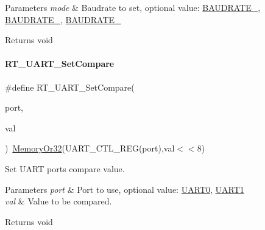 \begin{DoxyParams}{Parameters}
{\em mode} & Baudrate to set, optional value\+: \mbox{\hyperlink{a00056_a89d72bee69b33d0404d33f47608d16f0}{B\+A\+U\+D\+R\+A\+T\+E\+\_}}, \mbox{\hyperlink{a00056_ab94a89ecf1976f304764aec119e215e7}{B\+A\+U\+D\+R\+A\+T\+E\+\_}}, \mbox{\hyperlink{a00056_a9c74d2185a532185624b8dc3086f8e3e}{B\+A\+U\+D\+R\+A\+T\+E\+\_}} \\
\hline
\end{DoxyParams}
\begin{DoxyReturn}{Returns}
void 
\end{DoxyReturn}
\mbox{\label{a00056_a432520c6f67a10918aa07884250a7cbc}} 
\paragraph{\texorpdfstring{R\+T\+\_\+\+U\+A\+R\+T\+\_\+\+Set\+Compare}{RT\_UART\_SetCompare}}
{\footnotesize\ttfamily \#define R\+T\+\_\+\+U\+A\+R\+T\+\_\+\+Set\+Compare(\begin{DoxyParamCaption}\item[{}]{port,  }\item[{}]{val }\end{DoxyParamCaption})~\mbox{\hyperlink{a00020_a27874a97deab7cecdde5ddecf466e31e}{Memory\+Or32}}(U\+A\+R\+T\+\_\+\+C\+T\+L\+\_\+\+R\+EG(port),val$<$$<$8)}



Set U\+A\+RT port\textquotesingle{}s compare value. 


\begin{DoxyParams}{Parameters}
{\em port} & Port to use, optional value\+: \mbox{\hyperlink{a00056_a0508661f121639ffdee7de2353a0def2}{U\+A\+R\+T0}}, \mbox{\hyperlink{a00056_a8d69bf04d07af4fbbab5a8bd291f65ff}{U\+A\+R\+T1}} \\
\hline
{\em val} & Value to be compared. \\
\hline
\end{DoxyParams}
\begin{DoxyReturn}{Returns}
void 
\end{DoxyReturn}
\mbox{\label{a00056_a3c30d4d2e260d1c2f96747e9d7bdaf0d}} 
